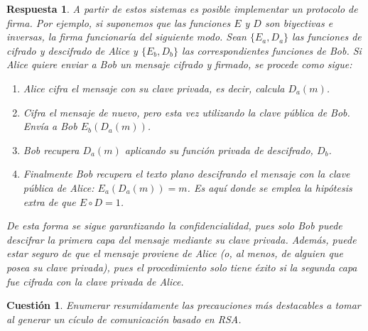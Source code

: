 \documentclass[
  a4paper,
  spanish,
  12pt,
]{scrartcl}
\theoremstyle{ejercicio-style}
\newtheorem{ejer}{Cuestión}
\theoremstyle{remark-style}
\newtheorem*{sol}{Respuesta}
\theoremstyle{teorema-style}
\begin{document}
\begin{sol}
  A partir de estos sistemas es posible implementar un protocolo de firma.
  Por ejemplo, si suponemos que las funciones $E$ y $D$ son biyectivas e inversas, la firma funcionaría del siguiente modo. Sean $\{ E_a, D_a \}$ las funciones de cifrado y descifrado de Alice y $\{ E_b, D_b \}$ las correspondientes funciones de Bob. Si Alice quiere enviar a Bob un mensaje cifrado y firmado, se procede como sigue:

  \begin{enumerate}
    \item Alice cifra el mensaje con su clave privada, es decir, calcula $D_a(m)$.
    \item Cifra el mensaje de nuevo, pero esta vez utilizando la clave pública de Bob. Envía a Bob $E_b(D_a(m))$.
    \item Bob recupera $D_a(m)$ aplicando su función privada de descifrado, $D_b$.
    \item Finalmente Bob recupera el texto plano descifrando el mensaje con la clave pública de Alice: $E_a(D_a(m)) = m$. Es aquí donde se emplea la hipótesis extra de que $E \circ D = 1$.
  \end{enumerate}

  De esta forma se sigue garantizando la confidencialidad, pues solo Bob puede descifrar la primera capa del mensaje mediante su clave privada. Además, puede estar seguro de que el mensaje proviene de Alice (o, al menos, de alguien que posea su clave privada), pues el procedimiento solo tiene éxito si la segunda capa fue cifrada con la clave privada de Alice.

\end{sol}


\begin{ejer}
  Enumerar resumidamente las precauciones más destacables a tomar al generar un cículo de comunicación basado en RSA.
\end{ejer}
\end{document}
